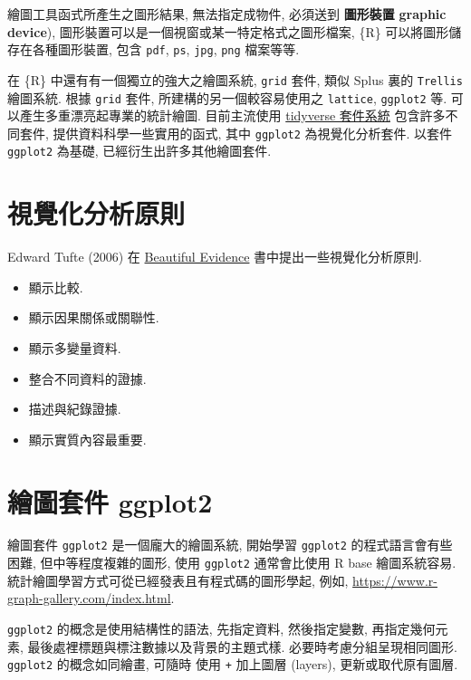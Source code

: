 \documentclass[
]{book}
\providecommand{\tightlist}{%
  \setlength{\itemsep}{0pt}\setlength{\parskip}{0pt}}
\begin{document}
繪圖工具函式所產生之圖形結果,
無法指定成物件,
必須送到
\textbf{圖形裝置}
\textbf{graphic device}),
圖形裝置可以是一個視窗或某一特定格式之圖形檔案,
\{R\} 可以將圖形儲存在各種圖形裝置,
包含 \texttt{pdf}, \texttt{ps}, \texttt{jpg}, \texttt{png} 檔案等等.

在 \{R\} 中還有有一個獨立的強大之繪圖系統,
\texttt{grid}
套件,
類似
Splus
裏的
\texttt{Trellis}
繪圖系統.
根據 \texttt{grid}
套件,
所建構的另一個較容易使用之
\texttt{lattice},
\texttt{ggplot2} 等.
可以產生多重漂亮起專業的統計繪圖.
目前主流使用
\href{https://www.tidyverse.org/}{tidyverse 套件系統}
包含許多不同套件,
提供資料科學一些實用的函式,
其中 \texttt{ggplot2} 為視覺化分析套件.
以套件 \texttt{ggplot2} 為基礎, 已經衍生出許多其他繪圖套件.

\hypertarget{ux8996ux89baux5316ux5206ux6790ux539fux5247}{%
\section{視覺化分析原則}\label{ux8996ux89baux5316ux5206ux6790ux539fux5247}}

Edward Tufte (2006) 在 \href{http://www.edwardtufte.com}{Beautiful Evidence}
書中提出一些視覺化分析原則.

\begin{itemize}
\tightlist
\item
  顯示比較.
\item
  顯示因果關係或關聯性.
\item
  顯示多變量資料.
\item
  整合不同資料的證據.
\item
  描述與紀錄證據.
\item
  顯示實質內容最重要.
\end{itemize}

\hypertarget{ux7e6aux5716ux5957ux4ef6-ggplot2}{%
\section{繪圖套件 ggplot2}\label{ux7e6aux5716ux5957ux4ef6-ggplot2}}

繪圖套件 \texttt{ggplot2} 是一個龐大的繪圖系統,
開始學習 \texttt{ggplot2} 的程式語言會有些困難,
但中等程度複雜的圖形, 使用 \texttt{ggplot2} 通常會比使用 R base 繪圖系統容易.
統計繪圖學習方式可從已經發表且有程式碼的圖形學起,
例如, \url{https://www.r-graph-gallery.com/index.html}.

\texttt{ggplot2} 的概念是使用結構性的語法,
先指定資料, 然後指定變數, 再指定幾何元素,
最後處裡標題與標注數據以及背景的主題式樣.
必要時考慮分組呈現相同圖形.
\texttt{ggplot2} 的概念如同繪畫, 可隨時
使用 \texttt{+} 加上圖層 (layers),
更新或取代原有圖層.
\end{document}
